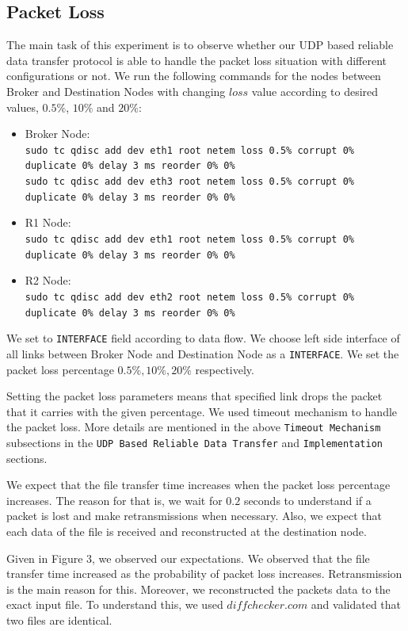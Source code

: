 \documentclass[conference]{IEEEtran}
\begin{document}
\subsection{Packet Loss}
The main task of this experiment is to observe whether our UDP based reliable data transfer protocol is able to handle the packet loss situation with different configurations or not. We run the following commands for the nodes between Broker and Destination Nodes with changing $loss$ value according to desired values, $0.5\%$, $10\%$ and $20\%$:
\begin{itemize}
    \item Broker Node: \\
        \texttt{sudo tc qdisc add dev eth1 root netem loss 0.5\% corrupt 0\% duplicate 0\% delay 3 ms reorder 0\% 0\%} \\
        \texttt{sudo tc qdisc add dev eth3 root netem loss 0.5\% corrupt 0\% duplicate 0\% delay 3 ms reorder 0\% 0\%}
        \item R1 Node: \\
        \texttt{sudo tc qdisc add dev eth1 root netem loss 0.5\% corrupt 0\% duplicate 0\% delay 3 ms reorder 0\% 0\%}
        \item R2 Node: \\
        \texttt{sudo tc qdisc add dev eth2 root netem loss 0.5\% corrupt 0\% duplicate 0\% delay 3 ms reorder 0\% 0\%}
\end{itemize}
\par We set to \texttt{INTERFACE} field according to data flow. We choose left side interface of all links between Broker Node and Destination Node as a \texttt{INTERFACE}. We set the packet loss percentage $0.5\%, 10\%, 20\%$ respectively.
\par Setting the packet loss parameters means that specified link drops the packet that it carries with the given percentage. We used timeout mechanism to handle the packet loss. More details are mentioned in the above  \texttt{Timeout Mechanism} subsections in the \texttt{UDP Based Reliable Data Transfer} and \texttt{Implementation} sections.
\par We expect that the file transfer time increases when the packet loss percentage increases. The reason for that is, we wait for $0.2$ seconds to understand if a packet is lost and make retransmissions when necessary. Also, we expect that each data of the file is received and reconstructed at the destination node.
\par Given in Figure 3, we observed our expectations. We observed that the file transfer time increased as the probability of packet loss increases. Retransmission is the main reason for this. Moreover, we reconstructed the packets data to the exact input file. To understand this, we used $diffchecker.com$ and validated that two files are identical.
\end{document}
